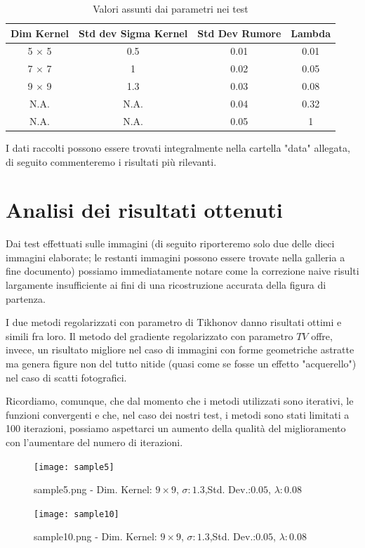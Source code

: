 \documentclass[12pt]{article}
\begin{document}
    \medskip
    \begin{table}[htb]
    \centering
    \begin{tabular}{||c c c c||}
         \hline
         Dim Kernel & Std dev Sigma Kernel & Std Dev Rumore & Lambda \\ [0.5ex]
         \hline\hline
         5 $\times$ 5 & 0.5 & 0.01 & 0.01 \\
         \hline
         7 $\times$ 7 & 1 & 0.02 & 0.05 \\
         \hline
         9 $\times$ 9 & 1.3 & 0.03 & 0.08 \\
         \hline
         N.A. & N.A. & 0.04 & 0.32 \\
         \hline
         N.A. & N.A. & 0.05 & 1 \\ [0.2ex]
         \hline
    \end{tabular}
    \caption{Valori assunti dai parametri nei test}
    \label{table:1}
    \end{table}

    I dati raccolti possono essere trovati integralmente nella cartella "data" allegata, di seguito commenteremo i risultati più rilevanti.

\section{Analisi dei risultati ottenuti}
    Dai test effettuati sulle immagini (di seguito riporteremo solo due delle dieci immagini elaborate; le restanti immagini possono essere trovate nella galleria a fine documento) possiamo immediatamente notare come la correzione naive risulti largamente insufficiente ai fini di una ricostruzione accurata della figura di partenza.

    I due metodi regolarizzati con parametro di Tikhonov danno risultati ottimi e simili fra loro. Il metodo del gradiente regolarizzato con parametro $TV$ offre, invece, un risultato migliore nel caso di immagini con forme geometriche astratte ma genera figure non del tutto nitide (quasi come se fosse un effetto "acquerello") nel caso di scatti fotografici.

    Ricordiamo, comunque, che dal momento che i metodi utilizzati sono iterativi, le funzioni convergenti e che, nel caso dei nostri test, i metodi sono stati limitati a 100 iterazioni, possiamo aspettarci un aumento della qualità del miglioramento con l'aumentare del numero di iterazioni.

    \newpage
    \begin{figure}[h!]
    \texttt{[image: sample5]}
    \caption{sample5.png - Dim. Kernel: $9\times9$, $\sigma:1.3$,Std. Dev.:$0.05$, $\lambda:0.08$}
    \end{figure}
    \newpage
    \begin{figure}[h!]
    \texttt{[image: sample10]}
    \caption{sample10.png - Dim. Kernel: $9\times9$, $\sigma:1.3$,Std. Dev.:$0.05$, $\lambda:0.08$}
    \end{figure}
    \newpage
\end{document}
